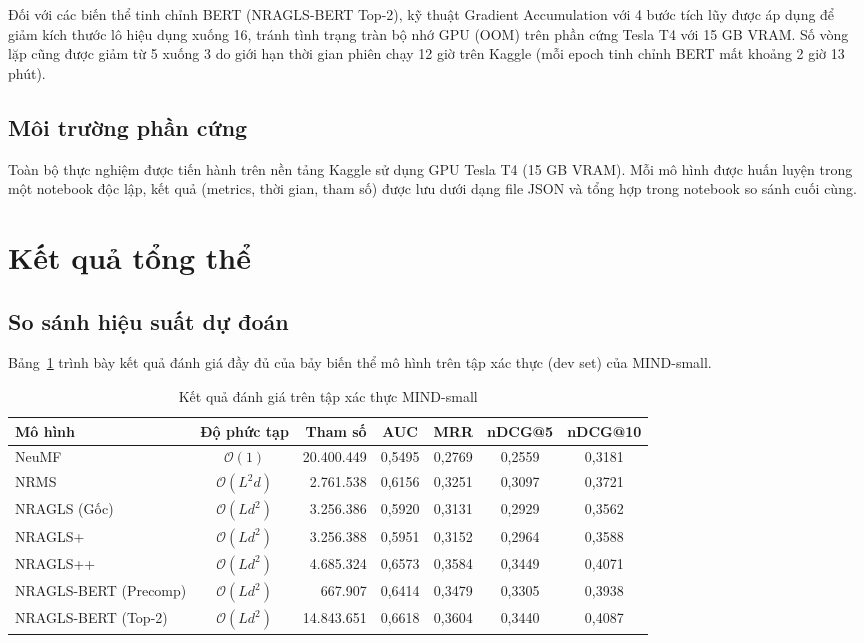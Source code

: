 \documentclass[../BTL.tex]{subfiles}
\begin{document}
Đối với các biến thể tinh chỉnh BERT (NRAGLS-BERT Top-2), kỹ thuật Gradient Accumulation với 4 bước tích lũy được áp dụng để giảm kích thước lô hiệu dụng xuống 16, tránh tình trạng tràn bộ nhớ GPU (OOM) trên phần cứng Tesla T4 với 15 GB VRAM. Số vòng lặp cũng được giảm từ 5 xuống 3 do giới hạn thời gian phiên chạy 12 giờ trên Kaggle (mỗi epoch tinh chỉnh BERT mất khoảng 2 giờ 13 phút).

\subsection{Môi trường phần cứng}

Toàn bộ thực nghiệm được tiến hành trên nền tảng Kaggle sử dụng GPU Tesla T4 (15 GB VRAM). Mỗi mô hình được huấn luyện trong một notebook độc lập, kết quả (metrics, thời gian, tham số) được lưu dưới dạng file JSON và tổng hợp trong notebook so sánh cuối cùng.

\section{Kết quả tổng thể}

\subsection{So sánh hiệu suất dự đoán}

Bảng~\ref{tab:results} trình bày kết quả đánh giá đầy đủ của bảy biến thể mô hình trên tập xác thực (dev set) của MIND-small.

\begin{table}[H]
\centering
\caption{Kết quả đánh giá trên tập xác thực MIND-small}
\label{tab:results}
\begin{tabular}{|l|c|r|c|c|c|c|}
\hline
Mô hình & Độ phức tạp & Tham số & AUC & MRR & nDCG@5 & nDCG@10 \\
\hline
NeuMF & $\mathcal{O}(1)$ & 20.400.449 & 0,5495 & 0,2769 & 0,2559 & 0,3181 \\
\hline
NRMS & $\mathcal{O}(L^2 d)$ & 2.761.538 & 0,6156 & 0,3251 & 0,3097 & 0,3721 \\
\hline
NRAGLS (Gốc) & $\mathcal{O}(Ld^2)$ & 3.256.386 & 0,5920 & 0,3131 & 0,2929 & 0,3562 \\
\hline
NRAGLS+ & $\mathcal{O}(Ld^2)$ & 3.256.388 & 0,5951 & 0,3152 & 0,2964 & 0,3588 \\
\hline
NRAGLS++ & $\mathcal{O}(Ld^2)$ & 4.685.324 & 0,6573 & 0,3584 & 0,3449 & 0,4071 \\
\hline
NRAGLS-BERT (Precomp) & $\mathcal{O}(Ld^2)$ & 667.907 & 0,6414 & 0,3479 & 0,3305 & 0,3938 \\
\hline
NRAGLS-BERT (Top-2) & $\mathcal{O}(Ld^2)$ & 14.843.651 & 0,6618 & 0,3604 & 0,3440 & 0,4087 \\
\hline
\end{tabular}
\end{table}
\end{document}
